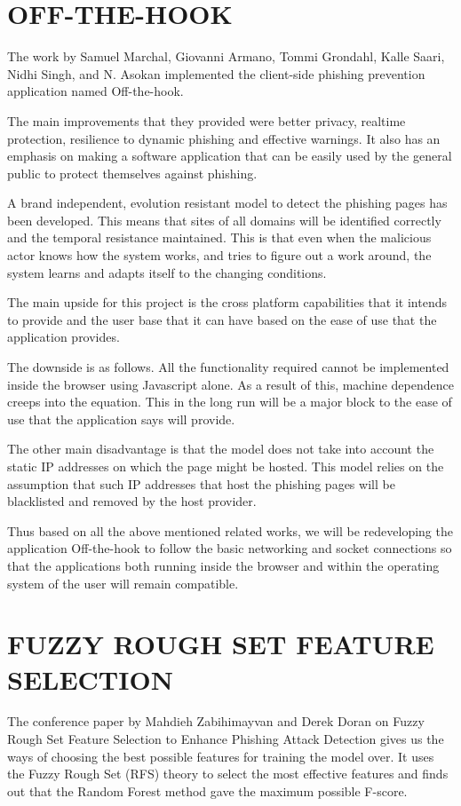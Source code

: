 \section{OFF-THE-HOOK}
The work by Samuel Marchal, Giovanni Armano, Tommi Grondahl, Kalle Saari, Nidhi Singh, and N. Asokan implemented the client-side phishing prevention application named Off-the-hook.

The main improvements that they provided were better privacy, realtime protection, resilience to dynamic phishing and effective warnings. It also has an emphasis on making a software application that can be easily used by the general public to protect themselves against phishing.

A brand independent, evolution resistant model to detect the phishing pages has been developed. This means that sites of all domains will be identified correctly and the temporal resistance maintained. This is that even when the malicious actor knows how the system works, and tries to figure out a work around, the system learns and adapts itself to the changing conditions.

The main upside for this project is the cross platform capabilities that it intends to provide and the user base that it can have based on the ease of use that the application provides.

The downside is as follows. All the functionality required cannot be implemented inside the browser using Javascript alone. As a result of this, machine dependence creeps into the equation. This in the long run will be a major block to the ease of use that the application says will provide.

The other main disadvantage is that the model does not take into account the static IP addresses on which the page might be hosted. This model relies on the assumption that such IP addresses that host the phishing pages will be blacklisted and removed by the host provider.

Thus based on all the above mentioned related works, we will be redeveloping the application Off-the-hook to follow the basic networking and socket connections so that the applications both running inside the browser and within the operating system of the user will remain compatible.

\section{FUZZY ROUGH SET FEATURE SELECTION}
The conference paper by Mahdieh Zabihimayvan and Derek Doran on Fuzzy Rough Set Feature Selection to Enhance Phishing Attack Detection gives us the ways of choosing the best possible features for training the model over. It uses the Fuzzy Rough Set (RFS) theory to select the most effective features and finds out that the Random Forest method gave the maximum possible F-score.

